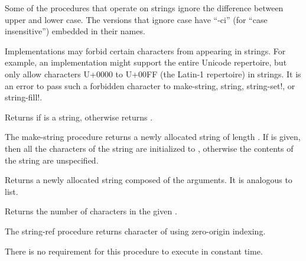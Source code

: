 \vest Some of the procedures that operate on strings ignore the
difference between upper and lower case.  The versions that ignore case
have \hbox{``{\cf -ci}''} (for ``case insensitive'') embedded in their
names.

Implementations may forbid certain characters from appearing in strings.
For example, an implementation might support the entire Unicode repertoire,
but only allow characters U+0000 to U+00FF (the Latin-1 repertoire) in
strings.  It is an error to pass such a forbidden character to
{\cf make-string}, {\cf string}, {\cf string-set!}, or {\cf string-fill!}.


\begin{entry}{%
}

Returns \schtrue{} if  is a string, otherwise returns \schfalse.
\end{entry}


\begin{entry}{%
}

The {\cf make-string} procedure returns a newly allocated string of
length .  If  is given, then all the characters of the string
are initialized to , otherwise the contents of the
string are unspecified.

\end{entry}

\begin{entry}{%
}

Returns a newly allocated string composed of the arguments.
It is analogous to {\cf list}.

\end{entry}

\begin{entry}{%
}

Returns the number of characters in the given .
\end{entry}


\begin{entry}{%
}

The {\cf string-ref} procedure returns character  of  using zero-origin indexing.
\end{entry}
There is no requirement for this procedure to execute in constant time.


